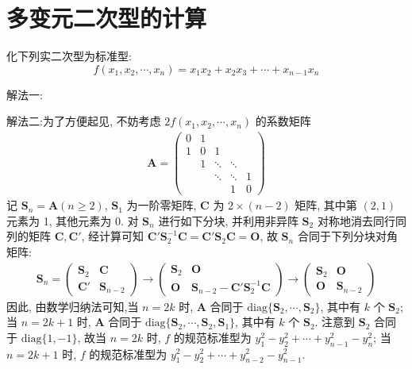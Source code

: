 \documentclass[../../main.tex]{subfiles}
\begin{document}
\section{多变元二次型的计算}

\begin{example}
化下列实二次型为标准型:
\[f(x_1,x_2,\cdots,x_n)=x_1x_2 + x_2x_3 + \cdots + x_{n - 1}x_n\]
\end{example}
\begin{solution}
{\color{blue}解法一:}

{\color{blue}解法二:}为了方便起见, 不妨考虑 \(2f(x_1,x_2,\cdots,x_n)\) 的系数矩阵
\begin{align*}
\boldsymbol{A} = \begin{pmatrix}
0 & 1 & & & \\
1 & 0 & 1 & & \\
& 1 & \ddots & \ddots & \\
& & \ddots & \ddots & 1 \\
& & & 1 & 0
\end{pmatrix}
\end{align*}
记 \(\boldsymbol{S}_n = \boldsymbol{A}(n\geq2)\), \(\boldsymbol{S}_1\) 为一阶零矩阵, \(\boldsymbol{C}\) 为 \(2\times(n - 2)\) 矩阵, 其中第 \((2,1)\) 元素为 1, 其他元素为 0. 对 \(\boldsymbol{S}_n\) 进行如下分块, 并利用非异阵 \(\boldsymbol{S}_2\) 对称地消去同行同列的矩阵 \(\boldsymbol{C},\boldsymbol{C}'\), 经计算可知 \(\boldsymbol{C}'\boldsymbol{S}_2^{-1}\boldsymbol{C} = \boldsymbol{C}'\boldsymbol{S}_2\boldsymbol{C} = \boldsymbol{O}\), 故 \(\boldsymbol{S}_n\) 合同于下列分块对角矩阵:
\begin{align*}
\boldsymbol{S}_n = \begin{pmatrix}
\boldsymbol{S}_2 & \boldsymbol{C} \\
\boldsymbol{C}' & \boldsymbol{S}_{n - 2}
\end{pmatrix} \to
\begin{pmatrix}
\boldsymbol{S}_2 & \boldsymbol{O} \\
\boldsymbol{O} & \boldsymbol{S}_{n - 2} - \boldsymbol{C}'\boldsymbol{S}_2^{-1}\boldsymbol{C}
\end{pmatrix} \to
\begin{pmatrix}
\boldsymbol{S}_2 & \boldsymbol{O} \\
\boldsymbol{O} & \boldsymbol{S}_{n - 2}
\end{pmatrix}
\end{align*}
因此, 由数学归纳法可知,当 \(n = 2k\) 时, \(\boldsymbol{A}\) 合同于 \(\mathrm{diag}\{\boldsymbol{S}_2,\cdots,\boldsymbol{S}_2\}\), 其中有 \(k\) 个 \(\boldsymbol{S}_2\); 当 \(n = 2k + 1\) 时, \(\boldsymbol{A}\) 合同于 \(\mathrm{diag}\{\boldsymbol{S}_2,\cdots,\boldsymbol{S}_2,\boldsymbol{S}_1\}\), 其中有 \(k\) 个 \(\boldsymbol{S}_2\). 注意到 \(\boldsymbol{S}_2\) 合同于 \(\mathrm{diag}\{1, - 1\}\), 故当 \(n = 2k\) 时, \(f\) 的规范标准型为 \(y_1^2 - y_2^2 + \cdots + y_{n - 1}^2 - y_n^2\); 当 \(n = 2k + 1\) 时, \(f\) 的规范标准型为 \(y_1^2 - y_2^2 + \cdots + y_{n - 2}^2 - y_{n - 1}^2\). 
\end{solution}
\end{document}
